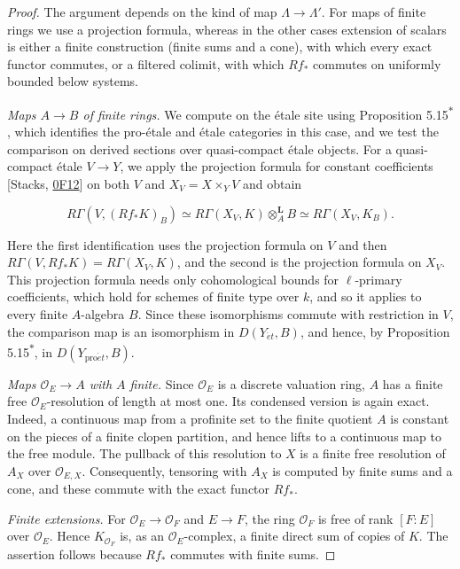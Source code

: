 \documentclass[11pt]{article}
\newcommand{\bpout}[1]{#1\textsuperscript{\hyperlink{bp-outside}{\ensuremath{\ast}}}}
\begin{document}
\begin{proof}[{Proof}]\label{bp17}%
The argument depends on the kind of map \(\Lambda\to\Lambda'\). For maps of finite rings we use a projection formula, whereas in the other cases extension of scalars is either a finite construction (finite sums and a cone), with which every exact functor commutes, or a filtered colimit, with which \(Rf_*\) commutes on uniformly bounded below systems.

\emph{Maps \(A\to B\) of finite rings.} We compute on the étale site using Proposition \bpout{5.15}, which identifies the pro-étale and étale categories in this case, and we test the comparison on derived sections over quasi-compact étale objects. For a quasi-compact étale \(V\to Y\), we apply the projection formula for constant coefficients [Stacks, \href{https://stacks.math.columbia.edu/tag/0F12}{0F12}] on both \(V\) and \(X_V=X\times_YV\) and obtain

\[
R\Gamma(V,(Rf_*K)_B)
\simeq R\Gamma(X_V,K)\otimes_A^{\mathbf L}B
\simeq R\Gamma(X_V,K_B).
\]

Here the first identification uses the projection formula on \(V\) and then \(R\Gamma(V,Rf_*K)=R\Gamma(X_V,K)\), and the second is the projection formula on \(X_V\). This projection formula needs only cohomological bounds for \(\ell\)-primary coefficients, which hold for schemes of finite type over \(k\), and so it applies to every finite \(A\)-algebra \(B\). Since these isomorphisms commute with restriction in \(V\), the comparison map is an isomorphism in \(D(Y_{\acute{e}t},B)\), and hence, by Proposition \bpout{5.15}, in \(D(Y_{\mathrm{pro}\acute{e}t},B)\).

\emph{Maps \(\mathcal O_E\to A\) with \(A\) finite.} Since \(\mathcal O_E\) is a discrete valuation ring, \(A\) has a finite free \(\mathcal O_E\)-resolution of length at most one. Its condensed version is again exact. Indeed, a continuous map from a profinite set to the finite quotient \(A\) is constant on the pieces of a finite clopen partition, and hence lifts to a continuous map to the free module. The pullback of this resolution to \(X\) is a finite free resolution of \(A_X\) over \(\mathcal O_{E,X}\). Consequently, tensoring with \(A_X\) is computed by finite sums and a cone, and these commute with the exact functor \(Rf_*\).

\emph{Finite extensions.} For \(\mathcal O_E\to\mathcal O_F\) and \(E\to F\), the ring \(\mathcal O_F\) is free of rank \([F:E]\) over \(\mathcal O_E\). Hence \(K_{\mathcal O_F}\) is, as an \(\mathcal O_E\)-complex, a finite direct sum of copies of \(K\). The assertion follows because \(Rf_*\) commutes with finite sums.


\end{proof}
\end{document}

